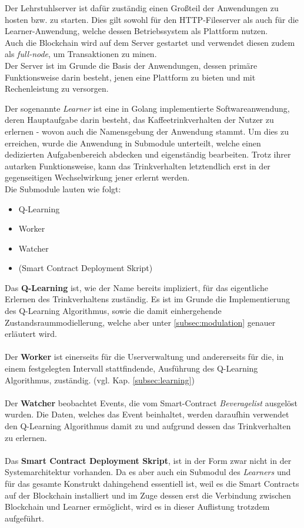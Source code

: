 Der Lehrstuhlserver ist dafür zuständig einen Großteil der Anwendungen zu hosten bzw. zu starten.
Dies gilt sowohl für den HTTP-Fileserver als auch für die Learner-Anwendung, welche dessen Betriebssystem als Plattform nutzen.\\
Auch die Blockchain wird auf dem Server gestartet und verwendet diesen zudem als \textit{full-node}, um Transaktionen zu minen.\\
Der Server ist im Grunde die Basis der Anwendungen, dessen primäre Funktionsweise darin besteht, jenen eine Plattform zu bieten und mit Rechenleistung zu versorgen.

Der sogenannte \textit{Learner} ist eine in Golang implementierte Softwareanwendung, deren Hauptaufgabe darin besteht, das Kaffeetrinkverhalten der Nutzer zu erlernen - wovon auch die Namensgebung der Anwendung stammt.
Um dies zu erreichen, wurde die Anwendung in Submodule unterteilt, welche einen dedizierten Aufgabenbereich abdecken und eigenständig bearbeiten.
Trotz ihrer autarken Funktionsweise, kann das Trinkverhalten letztendlich erst in der gegenseitigen Wechselwirkung jener erlernt werden. \\
Die Submodule lauten wie folgt:
\begin{itemize}
	\item Q-Learning
	\item Worker
	\item Watcher
	\item (Smart Contract Deployment Skript)
\end{itemize}

Das \textbf{Q-Learning} ist, wie der Name bereits impliziert, für das eigentliche Erlernen des Trinkverhaltens zuständig. Es ist im Grunde die Implementierung des Q-Learning Algorithmus, sowie die damit einhergehende Zustandsraummodiellerung, welche aber unter \ref{subsec:modulation} genauer erläutert wird.
\\\\
Der \textbf{Worker} ist einerseits für die Userverwaltung und andererseits für die, in einem festgelegten Intervall stattfindende, Ausführung des Q-Learning Algorithmus, zuständig. (vgl. Kap. \ref{subsec:learning})
\\\\
Der \textbf{Watcher} beobachtet Events, die vom Smart-Contract \textit{Beveragelist} ausgelöst wurden. Die Daten, welches das Event beinhaltet, werden daraufhin verwendet den Q-Learning Algorithmus damit zu  und aufgrund dessen das Trinkverhalten zu erlernen.
\\\\
Das \textbf{Smart Contract Deployment Skript}, ist in der Form zwar nicht in der Systemarchitektur vorhanden. Da es aber auch ein Submodul des \textit{Learners} und für das gesamte Konstrukt dahingehend essentiell ist, weil es die Smart Contracts auf der Blockchain installiert und im Zuge dessen erst die Verbindung zwischen Blockchain und Learner ermöglicht, wird es in dieser Auflistung trotzdem aufgeführt.

